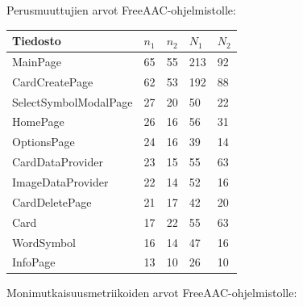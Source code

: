 \documentclass[utf8]{gradu3}
\begin{document}
Perusmuuttujien arvot FreeAAC-ohjelmistolle:

\begin{center}
    \begin{tabular}{| l | l | l | l | l |}
    \hline
    \textbf{Tiedosto} & \textbf{$n_1$} & \textbf{$n_2$} & \textbf{$N_1$} & \textbf{$N_2$} \\ \hline
    MainPage & 65 & 55 & 213 & 92 \\ \hline
    CardCreatePage & 62 & 53 & 192 & 88 \\ \hline
    SelectSymbolModalPage & 27 & 20 & 50 & 22 \\ \hline
    HomePage & 26 & 16 & 56 & 31 \\ \hline
    OptionsPage & 24 & 16 & 39 & 14 \\ \hline
    CardDataProvider & 23 & 15 & 55 & 63 \\ \hline
    ImageDataProvider & 22 & 14 & 52 & 16 \\ \hline
    CardDeletePage & 21 & 17 & 42 & 20 \\ \hline
    Card & 17 & 22 & 55 & 63 \\ \hline
    WordSymbol & 16 & 14 & 47 & 16 \\ \hline
    InfoPage & 13 & 10 & 26 & 10 \\ \hline
    \end{tabular}
\end{center}

Monimutkaisuusmetriikoiden arvot FreeAAC-ohjelmistolle:
\end{document}
